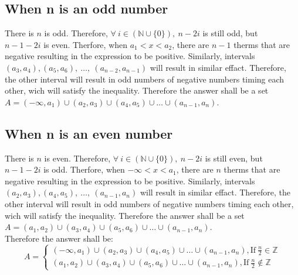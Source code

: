 \documentclass{article}
\begin{document}
    \subsection*{When n is an odd number}
        There is \(n\) is odd. Therefore, \(\forall \ i\in (\mathbb{N}\cup \{0\})
        ,\ n-2i \) is still odd, but \\ 
        \(n-1-2i\) is even.
        Therfore, when \(a_1<x<a_2\), there are \(n-1\) therms that are negative resulting in the expression to be positive.
        Similarly, intervals \((a_3,a_4),(a_5,a_6),\ \dots, \ (a_{n-2},a_{n-1})\) will result in similar effact.
        Therefore, the other interval will result in odd numbers of negative numbers timing each other, wich will satisfy the inequality.
        Therefore the answer shall be a set \(A = (-\infty,a_1)\cup (a_2,a_3)\cup (a_4,a_5)\cup \dots \cup (a_{n-1},a_n)\).

    \subsection*{When n is an even number}
        There is \(n\) is even. Therefore, \(\forall \ i\in (\mathbb{N}\cup \{0\})
        ,\ n-2i \) is still even, but \\
        \(n-1-2i\) is odd.
        Therfore, when \(-\infty <x<a_1\), there are \(n\) therms that are negative resulting in the expression to be positive.
        Similarly, intervals \((a_2,a_3),(a_4,a_5),\ \dots, \ (a_{n-1},a_{n})\) will result in similar effact.
        Therefore, the other interval will result in odd numbers of negative numbers timing each other, wich will satisfy the inequality.
        Therefore the answer shall be a set \(A = (a_1,a_2)\cup (a_3,a_4)\cup (a_5,a_6)\cup \dots \cup (a_{n-1},a_n)\).
    \\
    
    Therefore the answer shall be: 
    \begin{equation*}
        A = 
        \begin{cases}
            (-\infty,a_1)\cup (a_2,a_3)\cup (a_4,a_5)\cup \dots \cup (a_{n-1},a_n), \text{If}\  \frac{n}{2} \in \mathbb{Z}\\
            (a_1,a_2)\cup (a_3,a_4)\cup (a_5,a_6)\cup \dots \cup (a_{n-1},a_n), \text{If}\  \frac{n}{2} \notin \mathbb{Z}
        \end{cases}
    \end{equation*}
\end{document}
